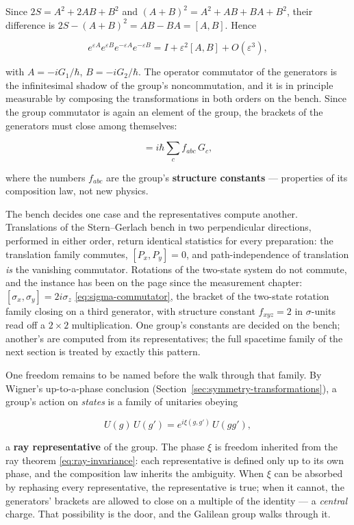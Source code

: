 Since $2S = A^{2} + 2AB + B^{2}$ and $(A+B)^{2} = A^{2} + AB + BA + B^{2}$, their difference is $2S - (A+B)^{2} = AB - BA = [A,B]$. Hence
\begin{linenomath}
    \begin{equation}
        e^{\varepsilon A}e^{\varepsilon B}e^{-\varepsilon A}e^{-\varepsilon B}
        = I + \varepsilon^{2}[A,B] + O(\varepsilon^{3}),
        \label{eq:lie-bracket}
    \end{equation}
\end{linenomath}
with $A=-iG_1/\hbar$, $B=-iG_2/\hbar$. The operator commutator of the generators is the infinitesimal shadow of the group's noncommutation, and it is in principle measurable by composing the transformations in both orders on the bench. Since the group commutator is again an element of the group, the brackets of the generators must close among themselves:
\begin{linenomath}
    \begin{equation}
        [G_a,G_b] = i\hbar\sum_c f_{abc}\,G_c,
        \label{eq:structure-constants}
    \end{equation}
\end{linenomath}
where the numbers $f_{abc}$ are the group's \textbf{structure constants} --- properties of its composition law, not new physics.

The bench decides one case and the representatives compute another. Translations of the Stern--Gerlach bench in two perpendicular directions, performed in either order, return identical statistics for every preparation: the translation family commutes, $[P_x,P_y]=0$, and path-independence of translation \emph{is} the vanishing commutator. Rotations of the two-state system do not commute, and the instance has been on the page since the measurement chapter: $[\sigma_x,\sigma_y]=2i\sigma_z$ \eqref{eq:sigma-commutator}, the bracket of the two-state rotation family closing on a third generator, with structure constant $f_{xyz}=2$ in $\sigma$-units read off a $2\times2$ multiplication. One group's constants are decided on the bench; another's are computed from its representatives; the full spacetime family of the next section is treated by exactly this pattern.

One freedom remains to be named before the walk through that family. By Wigner's up-to-a-phase conclusion (Section~\ref{sec:symmetry-transformations}), a group's action on \emph{states} is a family of unitaries obeying
\begin{linenomath}
    \begin{equation}
        U(g)\,U(g') = e^{i\xi(g,g')}\,U(gg'),
        \label{eq:ray-representative}
    \end{equation}
\end{linenomath}
a \textbf{ray representative} of the group. The phase $\xi$ is freedom inherited from the ray theorem \eqref{eq:ray-invariance}: each representative is defined only up to its own phase, and the composition law inherits the ambiguity. When $\xi$ can be absorbed by rephasing every representative, the representative is true; when it cannot, the generators' brackets are allowed to close on a multiple of the identity --- a \emph{central} charge. That possibility is the door, and the Galilean group walks through it.

